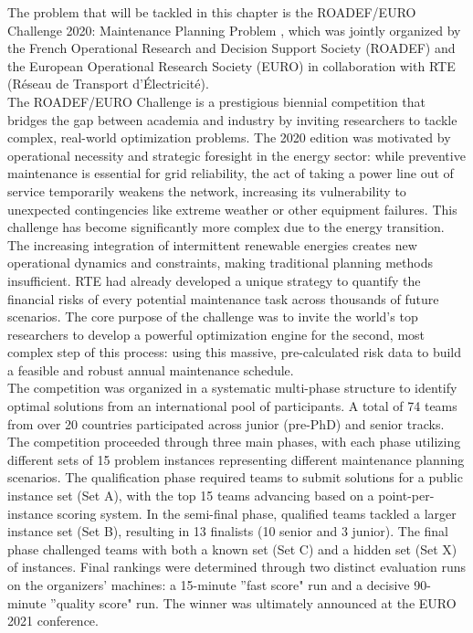 The problem that will be tackled in this chapter is the ROADEF/EURO Challenge 2020: Maintenance Planning Problem \cite{roadef2020}, which was jointly organized by the French Operational Research and Decision Support Society (ROADEF) and the European Operational Research Society (EURO) in collaboration with RTE (Réseau de Transport d'Électricité).\\

The ROADEF/EURO Challenge is a prestigious biennial competition that bridges the gap between academia and industry by inviting researchers to tackle complex, real-world optimization problems. The 2020 edition was motivated by operational necessity and strategic foresight in the energy sector: while preventive maintenance is essential for grid reliability, the act of taking a power line out of service temporarily weakens the network, increasing its vulnerability to unexpected contingencies like extreme weather or other equipment failures. This challenge has become significantly more complex due to the energy transition. The increasing integration of intermittent renewable energies creates new operational dynamics and constraints, making traditional planning methods insufficient. RTE had already developed a unique strategy to quantify the financial risks of every potential maintenance task across thousands of future scenarios. The core purpose of the challenge was to invite the world's top researchers to develop a powerful optimization engine for the second, most complex step of this process: using this massive, pre-calculated risk data to build a feasible and robust annual maintenance schedule.\\

The competition was organized in a systematic multi-phase structure to identify optimal solutions from an international pool of participants. A total of 74 teams from over 20 countries participated across junior (pre-PhD) and senior tracks. The competition proceeded through three main phases, with each phase utilizing different sets of 15 problem instances representing different maintenance planning scenarios. The qualification phase required teams to submit solutions for a public instance set (Set A), with the top 15 teams advancing based on a point-per-instance scoring system. In the semi-final phase, qualified teams tackled a larger instance set (Set B), resulting in 13 finalists (10 senior and 3 junior). The final phase challenged teams with both a known set (Set C) and a hidden set (Set X) of instances. Final rankings were determined through two distinct evaluation runs on the organizers' machines: a 15-minute ''fast score" run and a decisive 90-minute ''quality score" run. The winner was ultimately announced at the EURO 2021 conference. \\


